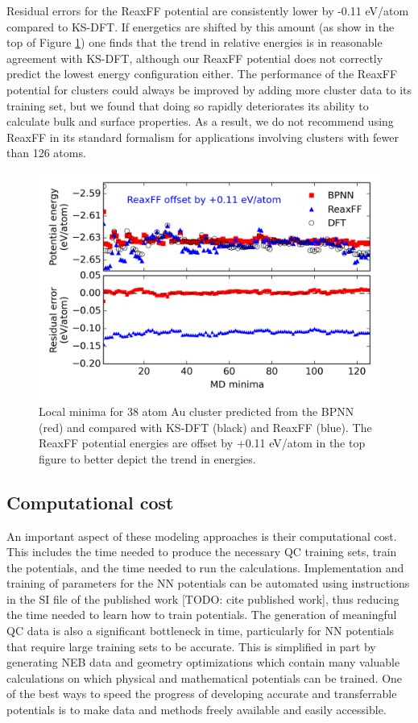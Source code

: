 \documentclass[12pt]{cmuthesis}
\begin{document}
Residual errors for the ReaxFF potential are consistently lower by -0.11 eV/atom compared to KS-DFT. If energetics are shifted by this amount (as show in the top of Figure \ref{fig-38atom-minima}) one finds that the trend in relative energies is in reasonable agreement with KS-DFT, although our ReaxFF potential does not correctly predict the lowest energy configuration either. The performance of the ReaxFF potential for clusters could always be improved by adding more cluster data to its training set, but we found that doing so rapidly deteriorates its ability to calculate bulk and surface properties. As a result, we do not recommend using ReaxFF in its standard formalism for applications involving clusters with fewer than 126 atoms.

\begin{figure}[h]
\centering
\includegraphics[width=5in]{./images/fig-38atom-minima.png}
\caption{\label{fig-38atom-minima}
Local minima for 38 atom Au cluster predicted from the BPNN (red) and compared with KS-DFT (black) and ReaxFF (blue). The ReaxFF potential energies are offset by +0.11 eV/atom in the top figure to better depict the trend in energies.}
\end{figure}

\subsection{Computational cost}
\label{sec:org3a7ba0a}
An important aspect of these modeling approaches is their computational cost. This includes the time needed to produce the necessary QC training sets, train the potentials, and the time needed to run the calculations. Implementation and training of parameters for the NN potentials can be automated using instructions in the SI file of the published work [TODO: cite published work], thus reducing the time needed to learn how to train potentials. The generation of meaningful QC data is also a significant bottleneck in time, particularly for NN potentials that require large training sets to be accurate. This is simplified in part by generating NEB data and geometry optimizations which contain many valuable calculations on which physical and mathematical potentials can be trained. One of the best ways to speed the progress of developing accurate and transferrable potentials is to make data and methods freely available and easily accessible.
\end{document}
